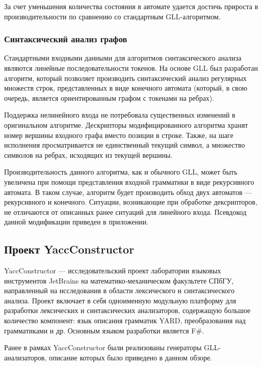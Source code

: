 За счет уменьшения количества состояния в автомате удается достичь прироста в производительности по сравнению со стандартным GLL-алгоритмом. 

\subsubsection{Синтаксический анализ графов}

Стандартными входными данными для алгоритмов синтаксического анализа являются линейные последовательности токенов. На основе GLL был разработан алгоритм, который позволяет производить синтаксический анализ регулярных множеств строк, представленных в виде конечного автомата (который, в свою очередь, является ориентированным графом с токенами на ребрах).

Поддержка нелинейного входа не потребовала существенных изменений в оригинальном алгоритме. Дескрипторы модифицированного алгоритма хранят номер вершины входного графа вместо позиции в строке. Также, на шаге исполнения просматривается не единственный текущий символ, а множество символов на ребрах, исходящих из текущей вершины.

Производительность данного алгоритма, как и обычного GLL, может быть увеличена при помощи представления входной грамматики в виде рекурсивного автомата. В таком случае, алгоритм будет производить обход двух автоматов --- рекурсивного и конечного. Ситуации, возникающие при обработке дексрипторов, не отличаются от описанных ранее ситуаций для линейного входа. Псевдокод данной модификации приведен в приложении.

\subsection{Проект YaccConstructor}

YaccConstructor --- исследовательский проект лаборатории языковых инструментов JetBrains на математико-механическом факультете СПбГУ, направленный на исследования в области лексического и синтаксического анализа. Проект включает в себя одноименную модульную платформу для разработки лексических и синтаксических анализаторов, содержащую большое количество компонент: язык описания грамматик YARD, преобразования над грамматиками и др. Основным языком разработки является F$\#$.

Ранее в рамках YaccConstructor были реализованы генераторы GLL-анализаторов, описание которых было приведено в данном обзоре. 
